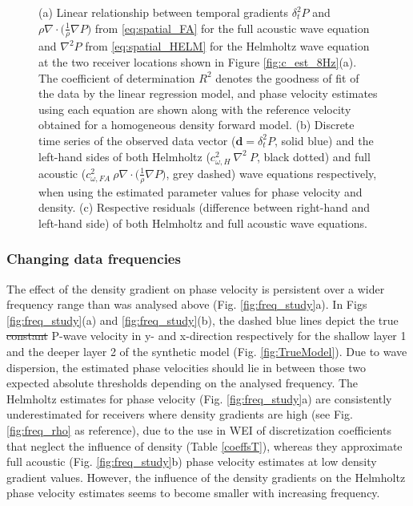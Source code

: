 \documentclass{article} %
\providecommand{\DIFdeltex}[1]{{\protect\color{red}\sout{#1}}}                      %
\providecommand{\DIFdelbegin}{} %
\providecommand{\DIFdelend}{} %
\providecommand{\DIFdel}[1]{\texorpdfstring{\DIFdeltex{#1}}{}} %
\newcommand{\DIFscaledelfig}{0.5}
\newlength{\DIFdelgraphicswidth} %
\newlength{\DIFdelgraphicsheight} %
\newcommand{\DIFdelincludegraphics}[2][]{%
\sbox{\DIFdelgraphicsbox}{\DIFOincludegraphics[#1]{#2}}%
\settoboxwidth{\DIFdelgraphicswidth}{\DIFdelgraphicsbox} %
\settoboxtotalheight{\DIFdelgraphicsheight}{\DIFdelgraphicsbox} %
\scalebox{\DIFscaledelfig}{%
\parbox[b]{\DIFdelgraphicswidth}{\usebox{\DIFdelgraphicsbox}\\[-\baselineskip] \rule{\DIFdelgraphicswidth}{0em}}\llap{\resizebox{\DIFdelgraphicswidth}{\DIFdelgraphicsheight}{%
\setlength{\unitlength}{\DIFdelgraphicswidth}%
\begin{picture}(1,1)%
\thicklines\linethickness{2pt} %
{\color[rgb]{1,0,0}\put(0,0){\framebox(1,1){}}}%
{\color[rgb]{1,0,0}\put(0,0){\line( 1,1){1}}}%
{\color[rgb]{1,0,0}\put(0,1){\line(1,-1){1}}}%
\end{picture}%
}\hspace*{3pt}}} %
} %
\DeclareRobustCommand{\DIFdelbegin}{\DIFOdelbegin \let\includegraphics\DIFdelincludegraphics} %
\DeclareRobustCommand{\DIFdelend}{\DIFOaddend \let\includegraphics\DIFOincludegraphics} %
\begin{document}
\begin{figure}[H]
	\caption{(a) Linear relationship between temporal gradients $\delta_{t}^{2}P$ and $\rho \nabla \cdot \big(\frac{1}{\rho} \nabla P\big)$ from \eqref{eq:spatial_FA} for the full acoustic wave equation and $\nabla^{2} P$ from \eqref{eq:spatial_HELM} for the Helmholtz wave equation at the two receiver locations shown in Figure \ref{fig:c_est_8Hz}(a). The coefficient of determination $R^{2}$ denotes the goodness of fit of the data by the linear regression model, and phase velocity estimates using each equation are shown along with the reference velocity obtained for a homogeneous density forward model. (b) Discrete time series of the observed data vector ($\bm{d} = \delta_{t}^{2}P$, solid blue) and the left-hand sides of both Helmholtz ($c_{\omega,H}^{2} \: \nabla^{2} \:P$, black dotted) and full acoustic ($c_{\omega,FA}^{2} \:  \rho \nabla \cdot \big(\frac{1}{\rho} \nabla P\big)$, grey dashed) wave equations respectively, when using the estimated parameter values for phase velocity and density. (c) Respective residuals (difference between right-hand and left-hand side) of both Helmholtz and full acoustic wave equations.}\label{fig:misfit}
	\end{figure} %

	
	\subsubsection*{Changing data frequencies} \label{sec:freqs}

	The effect of the density gradient on phase velocity is persistent over a wider frequency range than was analysed above (Fig. \ref{fig:freq_study}a). In Figs \ref{fig:freq_study}(a) and \ref{fig:freq_study}(b), the dashed blue lines depict the true \DIFdelbegin \DIFdel{constant }\DIFdelend P-wave velocity in y- and x-direction respectively for the shallow layer 1 and the deeper layer 2 of the synthetic model (Fig. \ref{fig:TrueModel}). Due to wave dispersion, the estimated phase velocities should lie in between those two expected absolute thresholds depending on the analysed frequency. The Helmholtz estimates for phase velocity (Fig. \ref{fig:freq_study}a) are consistently underestimated for receivers where density gradients are high (see Fig. \ref{fig:freq_rho} as reference), due to the use in WEI of discretization coefficients that neglect the influence of density (Table \ref{coeffsT}),  whereas they approximate full acoustic (Fig. \ref{fig:freq_study}b) phase velocity estimates at low density gradient values. However, the influence of the density gradients on the Helmholtz phase velocity estimates seems to become smaller with increasing frequency.
\end{document}
